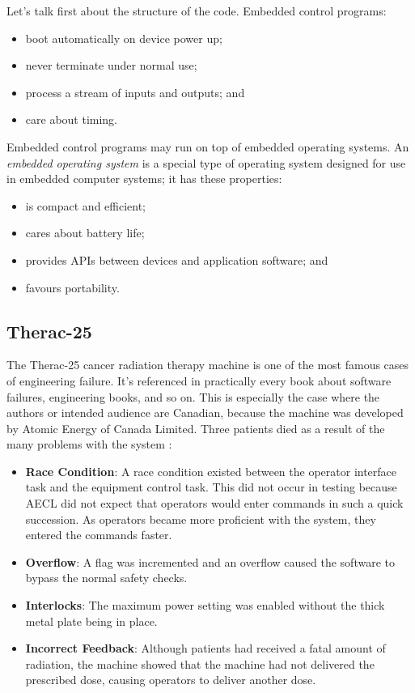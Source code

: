 Let's talk first about the structure of the code. Embedded control programs:
\begin{itemize}
\item boot automatically on device power up;
\item never terminate under normal use;
\item process a stream of inputs and outputs; and
\item care about timing.
\end{itemize}

Embedded control programs may run on top of embedded operating systems.
An \emph{embedded operating system} is a special type of operating system designed for use in embedded computer systems; it has these properties:
\begin{itemize}
\item is compact and efficient;
\item cares about battery life;
\item provides APIs between devices and application software; and
\item favours portability.
\end{itemize}

\subsection*{Therac-25}
The Therac-25 cancer radiation therapy machine is one of the most famous cases of engineering failure. It's referenced in practically every book about software failures, engineering books, and so on. This is especially the case where the authors or intended audience are Canadian, because the machine was developed by Atomic Energy of Canada Limited. Three patients died as a result of the many problems with the system \cite{spos}:

\begin{itemize}
	\item \textbf{Race Condition}: A race condition existed between the operator interface task and the equipment control task. This did not occur in testing because AECL did not expect that operators would enter commands in such a quick succession. As operators became more proficient with the system, they entered the commands faster.
	\item \textbf{Overflow}: A flag was incremented and an overflow caused the software to bypass the normal safety checks.
	\item \textbf{Interlocks}: The maximum power setting was enabled without the thick metal plate being in place.
	\item \textbf{Incorrect Feedback}: Although patients had received a fatal amount of radiation, the machine showed that the machine had not delivered the prescribed dose, causing operators to deliver another dose.
\end{itemize}


